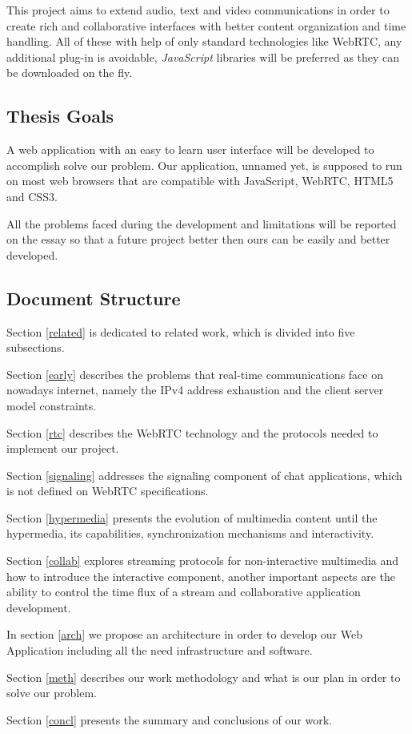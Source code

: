 	This project aims to extend audio, text and video communications in order to create rich and collaborative interfaces with better content organization and time handling. All of these with help of only standard technologies like \ac{WebRTC}, any additional plug-in is avoidable, \emph{JavaScript} libraries will be preferred as they can be downloaded on the fly.  

\subsection{Thesis Goals} %

	A web application with an easy to learn user interface will be developed to accomplish solve our problem. Our application, unnamed yet, is supposed to run on most web browsers that are compatible with JavaScript, \ac{WebRTC}, \ac{HTML}5 and \ac{CSS}3.

	All the problems faced during the development and limitations will be reported on the essay so that a future project better then ours can be easily and better developed.

\subsection{Document Structure} %

	Section \ref{related} is dedicated to related work, which is divided into five subsections. 

	Section \ref{early} describes the problems that real-time communications face on nowadays internet, namely the \ac{IPv4} address exhaustion and the client server model constraints. 

	Section \ref{rtc} describes the \ac{WebRTC} technology and the protocols needed to implement our project. 

	Section \ref{signaling} addresses the signaling component of chat applications, which is not defined on \ac{WebRTC} specifications. 

	Section \ref{hypermedia} presents the evolution of multimedia content until the hypermedia, its capabilities, synchronization mechanisms and interactivity. 

	Section \ref{collab} explores streaming protocols for non-interactive multimedia and how to introduce the interactive component, another important aspects are the ability to control the time flux of a stream and collaborative application development.

	In section \ref{arch} we propose an architecture in order to develop our Web Application including all the need infrastructure and software.

	Section \ref{meth} describes our work methodology and what is our plan in order to solve our problem.

	Section \ref{concl} presents the summary and conclusions of our work.

